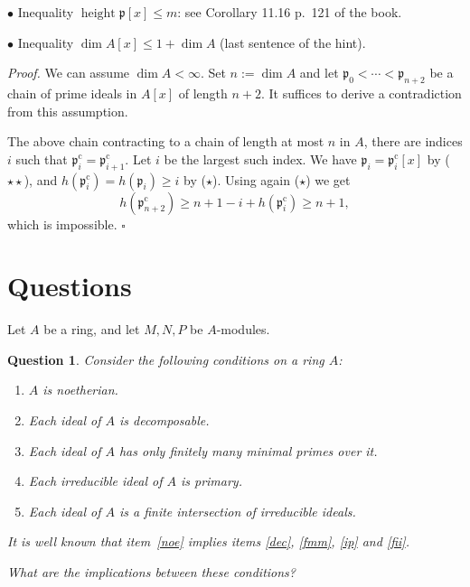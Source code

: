 \documentclass[parskip=half,fontsize=12pt]{scrartcl}%
\newcommand{\oo}{\operatorname}\newcommand{\ooo}{\operatorname*}
\newcommand{\mf}{\mathfrak}
\newcommand{\ppp}{\mf p}
\newtheorem{qn}[thm]{Question}
\begin{document}
$\bullet$ Inequality $\oo{height }\ppp[x]\le m$: see Corollary 11.16 p.~121 of the book.

$\bullet$ Inequality $\dim A[x]\le1+\dim A$ (last sentence of the hint). 



\emph{Proof.} We can assume $\dim A<\infty$. Set $n:=\dim A$ and let 
$ 
\ppp_0<\cdots<\ppp_{n+2}
$ 
be a chain of prime ideals in $A[x]$ of length $n+2$. It suffices to derive a contradiction from this assumption. 

The above chain contracting to a chain of length at most $n$ in $A$, there are indices $i$ such that $\ppp_i^{\oo c}=\ppp_{i+1}^{\oo c}$. Let $i$ be the largest such index. We have $\ppp_i=\ppp_i^{\oo c}[x]$ by ($\star\star$), and $h(\ppp_i^{\oo c})=h(\ppp_i)\ge i$ by ($\star$). Using again ($\star$) we get  
$$
h(\ppp_{n+2}^{\oo c})\ge n+1-i+h(\ppp_i^{\oo c})\ge n+1,
$$ 
which is impossible. $\square$

\section{Questions}%

Let $A$ be a ring, and let $M,N,P$ be $A$-modules.



\begin{qn}
Consider the following conditions on a ring $A$:

\begin{enumerate}
\item\label{noe} $A$ is noetherian.
\item\label{dec} Each ideal of $A$ is decomposable.
\item\label{fmm} Each ideal of $A$ has only finitely many minimal primes over it.
\item\label{ip} Each irreducible ideal of $A$ is primary.
\item\label{fii} Each ideal of $A$ is a finite intersection of irreducible ideals.
\end{enumerate}

It is well known that item~\ref{noe} implies items \ref{dec}, \ref{fmm}, \ref{ip} and \ref{fii}.%

What are the implications between these conditions?
\end{qn}
\end{document}
